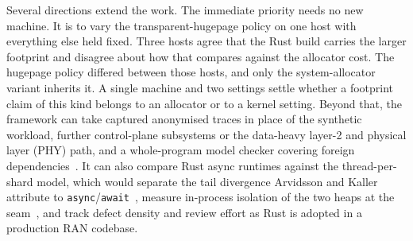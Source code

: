 \documentclass[english,oneside,a4paper,censored,csm,software-track-2020]{HYthesisML}
\begin{document}
Several directions extend the work. The immediate priority needs no new machine. It is to vary
the transparent-hugepage policy on one host with everything else held fixed. Three hosts agree
that the Rust build carries the larger footprint and disagree about how that compares against the
allocator cost. The hugepage policy differed between those hosts, and only the system-allocator
variant inherits it. A single machine and two settings settle whether a footprint claim of this kind
belongs to an allocator or to a kernel setting. Beyond that, the framework can take captured
anonymised traces in place of the synthetic workload, further control-plane
subsystems or the data-heavy layer-2 and physical layer (PHY) path, and a whole-program model
checker covering foreign dependencies~\cite{pearce2026rustmc}. It can also compare Rust async
runtimes against the thread-per-shard model, which would separate the tail divergence Arvidsson
and Kaller attribute to \texttt{async}/\texttt{await}~\cite{arvidsson2025async}, measure
in-process isolation of the two heaps at the seam~\cite{rivera2021galeed,kirth2022pkrusafe},
and track defect density and review effort as Rust is adopted in a production RAN codebase.



\cleardoublepage %

\printbibliography
\end{document}
